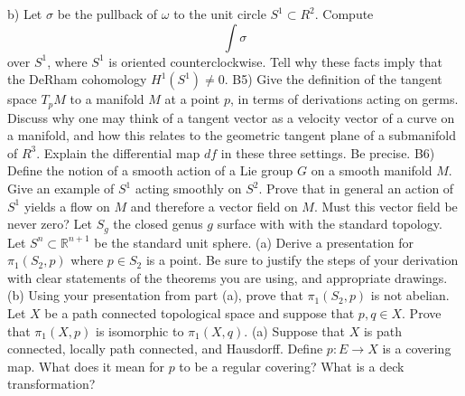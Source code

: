 \documentclass[14pt]{extarticle}
\begin{document}
b) Let $\sigma$ be the pullback of $\omega$ to the unit circle $S^{1} \subset R^{2}$. Compute
$$
\int \sigma
$$
over $S^{1}$, where $S^{1}$ is oriented counterclockwise. Tell why these facts imply that the DeRham cohomology $H^{1}\left(S^{1}\right) \neq 0$.
\newpage
B5) Give the definition of the tangent space $T_{p} M$ to a manifold $M$ at a point $p$, in terms of derivations acting on germs. Discuss why one may think of a tangent vector as a velocity vector of a curve on a manifold, and how this relates to the geometric tangent plane of a submanifold of $R^{3}$. Explain the differential map $d f$ in these three settings. Be precise.
\newpage
B6) Define the notion of a smooth action of a Lie group $G$ on a smooth manifold $M$. Give an example of $S^{1}$ acting smoothly on $S^{2}$. Prove that in general an action of $S^{1}$ yields a flow on $M$ and therefore a vector field on $M$. Must this vector field be never zero?
\newpage
Let $S_{g}$ the closed genus $g$ surface with with the standard topology. Let $S^{n} \subset \mathbb{R}^{n+1}$ be the standard unit sphere.
(a) Derive a presentation for $\pi_{1}\left(S_{2}, p\right)$ where $p \in S_{2}$ is a point. Be sure to justify the steps of your derivation with clear statements of the theorems you are using, and appropriate drawings.
(b) Using your presentation from part (a), prove that $\pi_{1}\left(S_{2}, p\right)$ is not abelian.
\newpage
Let $X$ be a path connected topological space and suppose that $p, q \in X$. Prove that $\pi_{1}(X, p)$ is isomorphic to $\pi_{1}(X, q)$.
(a) Suppose that $X$ is path connected, locally path connected, and Hausdorff. Define $p: E \rightarrow X$ is a covering map. What does it mean for $p$ to be a regular covering? What is a deck transformation?
\end{document}
